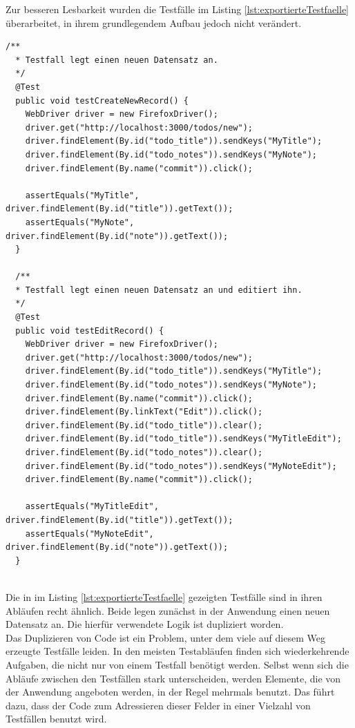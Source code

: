 Zur besseren Lesbarkeit wurden die Testfälle im Listing \ref{lst:exportierteTestfaelle} überarbeitet, in ihrem grundlegendem Aufbau jedoch nicht verändert.\\
\begin{lstlisting}[caption={Exportierte Testfälle},label={lst:exportierteTestfaelle}]
  /**
  * Testfall legt einen neuen Datensatz an.
  */
  @Test
  public void testCreateNewRecord() {
    WebDriver driver = new FirefoxDriver();
    driver.get("http://localhost:3000/todos/new");
    driver.findElement(By.id("todo_title")).sendKeys("MyTitle");
    driver.findElement(By.id("todo_notes")).sendKeys("MyNote");
    driver.findElement(By.name("commit")).click();
  
    assertEquals("MyTitle", driver.findElement(By.id("title")).getText());
    assertEquals("MyNote", driver.findElement(By.id("note")).getText());
  }
  
  /**
  * Testfall legt einen neuen Datensatz an und editiert ihn.
  */
  @Test
  public void testEditRecord() {
    WebDriver driver = new FirefoxDriver();
    driver.get("http://localhost:3000/todos/new");
    driver.findElement(By.id("todo_title")).sendKeys("MyTitle");
    driver.findElement(By.id("todo_notes")).sendKeys("MyNote");
    driver.findElement(By.name("commit")).click();
    driver.findElement(By.linkText("Edit")).click();
    driver.findElement(By.id("todo_title")).clear();
    driver.findElement(By.id("todo_title")).sendKeys("MyTitleEdit");
    driver.findElement(By.id("todo_notes")).clear();
    driver.findElement(By.id("todo_notes")).sendKeys("MyNoteEdit");
    driver.findElement(By.name("commit")).click();
    
    assertEquals("MyTitleEdit", driver.findElement(By.id("title")).getText());
    assertEquals("MyNoteEdit", driver.findElement(By.id("note")).getText());
  }
  
\end{lstlisting}
Die in im Listing \ref{lst:exportierteTestfaelle} gezeigten Testfälle sind in ihren Abläufen recht ähnlich. Beide legen zunächst in der Anwendung einen neuen Datensatz an. Die hierfür verwendete Logik ist dupliziert worden.\\
Das Duplizieren von Code ist ein Problem, unter dem viele auf diesem Weg erzeugte Testfälle leiden. In den meisten Testabläufen finden sich wiederkehrende Aufgaben, die nicht nur von einem Testfall benötigt werden.
Selbst wenn sich die Abläufe zwischen den Testfällen stark unterscheiden, werden Elemente, die von der Anwendung angeboten werden, in der Regel mehrmals benutzt. Das führt dazu, dass der Code zum Adressieren dieser Felder in einer Vielzahl von Testfällen benutzt wird.\\
